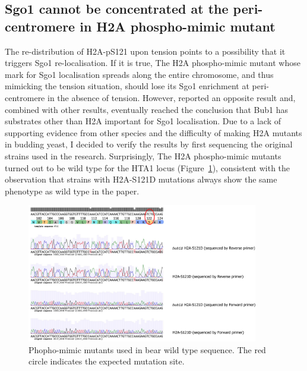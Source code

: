 \subsection{Sgo1 cannot be concentrated at the peri-centromere in H2A phospho-mimic mutant}

The re-distribution of H2A-pS121 upon tension points to a possibility that it triggers Sgo1 re-localisation. If it is true, The H2A phospho-mimic mutant whose mark for Sgo1 localisation spreads along the entire chromosome, and thus mimicking the tension situation, should lose its Sgo1 enrichment at peri-centromere in the absence of tension. However, \cite{Nerusheva2014} reported an opposite result and, combined with other results, eventually reached the conclusion that Bub1 has substrates other than H2A important for Sgo1 localisation. Due to a lack of supporting evidence from other species and the difficulty of making H2A mutants in budding yeast, I decided to verify the results by first sequencing the original strains used in the research. Surprisingly, The H2A phospho-mimic mutants turned out to be wild type for the HTA1 locus (Figure~\ref{fig:h2as121dseq}), consistent with the observation that strains with H2A-S121D mutations always show the same phenotype as wild type in the paper. 

\begin{figure}[htbp]
  \centering
  \includegraphics[width=0.9\textwidth]{chapter3/figures/nerusheva_sequencing.pdf}
  \caption[H2A phopho-mimic mutants used in \citep{Nerusheva2014} bear wild type sequence]{Phopho-mimic mutants used in \citep{Nerusheva2014} bear wild type sequence. The red circle indicates the expected mutation site.}
  \label{fig:h2as121dseq}
\end{figure}

